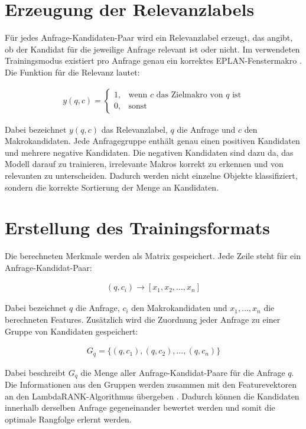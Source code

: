 \section{Erzeugung der Relevanzlabels}

Für jedes Anfrage-Kandidaten-Paar wird ein Relevanzlabel erzeugt, das angibt, ob der Kandidat für die jeweilige Anfrage relevant ist oder nicht. Im verwendeten Trainingsmodus existiert pro Anfrage genau ein korrektes EPLAN-Fenstermakro \cite{EPLAN-Makros}. Die Funktion für die Relevanz lautet:

\begin{align}
    y(q,c) = \begin{cases} 1, & \text{wenn } c \text{ das Zielmakro von } q \text{ ist} \\ 0, & \text{sonst} \end{cases}
\end{align}

Dabei bezeichnet $y(q,c)$ das Relevanzlabel, $q$ die Anfrage und $c$ den Makrokandidaten. Jede Anfragegruppe enthält genau einen positiven Kandidaten und mehrere negative Kandidaten. Die negativen Kandidaten sind dazu da, das Modell darauf zu trainieren, irrelevante Makros korrekt zu erkennen und von relevanten zu unterscheiden. Dadurch werden nicht einzelne Objekte klassifiziert, sondern die korrekte Sortierung der Menge an Kandidaten.

\section{Erstellung des Trainingsformats}

Die berechneten Merkmale werden als Matrix gespeichert. Jede Zeile steht für ein Anfrage-Kandidat-Paar:

\begin{align}
    (q,c_i) \rightarrow [x_1,x_2,\dots,x_n]
\end{align}

Dabei bezeichnet $q$ die Anfrage, $c_i$ den Makrokandidaten und $x_1,\dots,x_n$ die berechneten Features. Zusätzlich wird die Zuordnung jeder Anfrage zu einer Gruppe von Kandidaten gespeichert:

\begin{align}
    G_q = \{(q,c_1),(q,c_2),\dots,(q,c_n)\}
\end{align}

Dabei beschreibt $G_q$ die Menge aller Anfrage-Kandidat-Paare für die Anfrage $q$. Die Informationen aus den Gruppen werden zusammen mit den Featurevektoren an den LambdaRANK-Algorithmus übergeben \cite{src_step931}. Dadurch können die Kandidaten innerhalb derselben Anfrage gegeneinander bewertet werden und somit die optimale Rangfolge erlernt werden.

